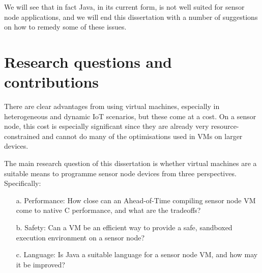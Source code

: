 We will see that in fact Java, in its current form, is not well suited for sensor node applications, and we will end this dissertation with a number of suggestions on how to remedy some of these issues.


\newpage
\section{Research questions and contributions}
\label{sec-introduction-research-questions}
There are clear advantages from using virtual machines, especially in heterogeneous and dynamic IoT scenarios, but these come at a cost. On a sensor node, this cost is especially significant since they are already very resource-constrained and cannot do many of the optimisations used in VMs on larger devices.

The main research question of this dissertation is whether virtual machines are a suitable means to programme sensor node devices from three perspectives.
Specifically:
\begin{enumerate}
    \item[a.] Performance: How close can an Ahead-of-Time compiling sensor node VM come to native C performance, and what are the tradeoffs?
    \item[b.] Safety: Can a VM be an efficient way to provide a safe, sandboxed execution environment on a sensor node?
    \item[c.] Language: Is Java a suitable language for a sensor node VM, and how may it be improved?
\end{enumerate}

